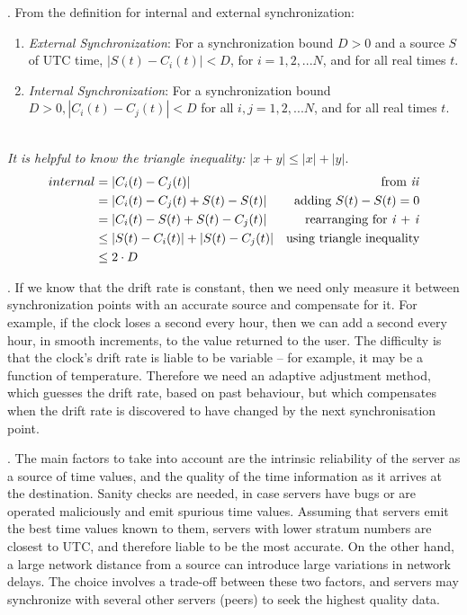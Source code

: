 \documentclass[12pt]{article}
\newcounter{question}
\newcommand{\question}[1]{
    \stepcounter{question}
    \thequestion. #1 \hfill
}
\begin{document}
\question{From the definition for internal and external synchronization:

    \begin{enumerate}[label=\emph{\roman*})]
        \item \textit{External Synchronization}: For a synchronization bound $D > 0$ and a source $S$ of UTC time, $|S(t) - C_i(t)| < D$, for $i = 1,2,...N$, and for all real times $t$.
        \item \textit{Internal Synchronization}: For a synchronization bound $D > 0, |C_i(t) - C_j(t)| < D$ for all $i,j = 1,2,...N$, and for all real times $t$.
    \end{enumerate}\\
    \textit{It is helpful to know the triangle inequality:} $|x+y| \leq |x| + |y|$.\\
    \begin{align*}
        internal&= |C_i(t) - C_j(t)| &\text{from  \emph{ii}}\\
                &= |C_i(t) - C_j(t) + S(t) - S(t)| &\text{adding $S(t)-S(t)=0$}\\
                &= |C_i(t) - S(t) + S(t) - C_j(t)| &\text{rearranging for \emph{i} + \emph{i}}\\
                &\leq |S(t) - C_i(t)| + |S(t) - C_j(t)| &\text{using triangle inequality}\\
                &\leq 2 \cdot D
    \end{align*}
}

\question{If we know that the drift rate is constant, then we need only measure it between synchronization points with
    an accurate source and compensate for it. For example, if the clock loses a second every hour, then we can add
    a second every hour, in smooth increments, to the value returned to the user. The difficulty is that the clock’s
    drift rate is liable to be variable – for example, it may be a function of temperature. Therefore we need an
adaptive adjustment method, which guesses the drift rate, based on past behaviour, but which compensates when the drift rate is discovered to have changed by the next synchronisation point. }

\question{The main factors to take into account are the intrinsic reliability of the server as a source of time values, and
    the quality of the time information as it arrives at the destination. Sanity checks are needed, in case servers
    have bugs or are operated maliciously and emit spurious time values. Assuming that servers emit the best time
    values known to them, servers with lower stratum numbers are closest to UTC, and therefore liable to be the
    most accurate. On the other hand, a large network distance from a source can introduce large variations in
network delays. The choice involves a trade-off between these two factors, and servers may synchronize with several other servers (peers) to seek the highest quality data.}
\end{document}
